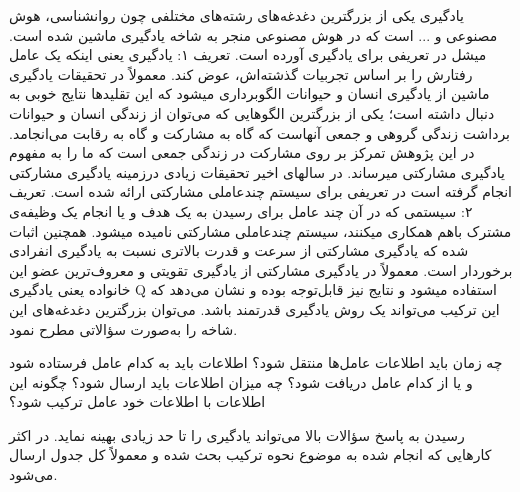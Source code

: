 \documentclass[12pt,a4paper]{article}
\begin{document}
یادگیری یکی از بزرگترین دغدغه‌های رشته‌های مختلفی چون روانشناسی، هوش مصنوعی و ... است که در هوش مصنوعی
منجر به شاخه یادگیری ماشین شده است. میشل در  تعریفی برای یادگیری آورده است.
تعریف ۱: یادگیری یعنی اینکه یک عامل رفتارش را بر اساس تجربیات گذشته‌اش، عوض کند.
معمولاً در تحقیقات یادگیری ماشین از یادگیری انسان و حیوانات الگوبرداری میشود که این تقلیدها نتایج خوبی به دنبال
داشته است؛ یکی از بزرگترین الگوهایی که می‌توان از زندگی انسان و حیوانات برداشت زندگی گروهی و جمعی آنهاست که
گاه به مشارکت و گاه به رقابت می‌انجامد. در این پژوهش تمرکز بر روی مشارکت در زندگی جمعی است که ما را به مفهوم
یادگیری مشارکتی میرساند. در سالهای اخیر تحقیقات زیادی درزمینه یادگیری مشارکتی انجام گرفته است در  تعریفی برای
سیستم چندعاملی مشارکتی ارائه شده است.
تعریف ۲: سیستمی که در آن چند عامل برای رسیدن به یک هدف و یا انجام یک وظیفه‌ی مشترک باهم همکاری میکنند،
سیستم چندعاملی مشارکتی نامیده میشود.
همچنین اثبات شده که یادگیری مشارکتی از سرعت و قدرت بالاتری نسبت به یادگیری انفرادی برخوردار است. معمولاً در
یادگیری مشارکتی از یادگیری تقویتی و معروف‌ترین عضو این خانواده یعنی یادگیری Q استفاده میشود و نتایج نیز قابل‌توجه بوده
و نشان می‌دهد که این ترکیب می‌تواند یک روش یادگیری قدرتمند باشد. می‌توان بزرگترین دغدغه‌های این شاخه را به‌صورت
سؤالاتی مطرح نمود.
\begin{enumerate}\setlength\itemsep{-.5em}
 چه زمان باید اطلاعات عامل‌ها منتقل شود؟
 اطلاعات باید به کدام عامل فرستاده شود و یا از کدام عامل دریافت شود؟
 چه میزان اطلاعات باید ارسال شود؟
 چگونه این اطلاعات با اطلاعات خود عامل ترکیب شود؟
\end{enumerate}
رسیدن به پاسخ سؤالات بالا می‌تواند یادگیری را تا حد زیادی بهینه نماید. در اکثر کارهایی که انجام شده به موضوع نحوه
ترکیب بحث شده و معمولاً کل جدول ارسال می‌شود.
\end{document}
